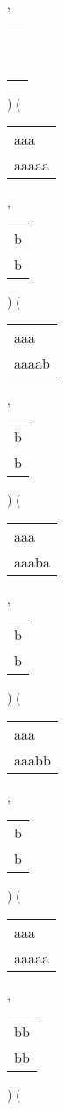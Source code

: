 \begin{description}
 , 
\begin{tabular}{|l|} \hline
\ \\ \ \\ \hline
\end{tabular} 
) 
 ( 
\begin{tabular}{|l|} \hline
aaa\ \  \\
aaaaa \\
\hline
\end{tabular} 
 , 
\begin{tabular}{|l|} \hline
b \\
b \\
\hline
\end{tabular} 
) 
 ( 
\begin{tabular}{|l|} \hline
aaa\ \  \\
aaaab \\
\hline
\end{tabular} 
 , 
\begin{tabular}{|l|} \hline
b \\
b \\
\hline
\end{tabular} 
) 
 ( 
\begin{tabular}{|l|} \hline
aaa\ \  \\
aaaba \\
\hline
\end{tabular} 
 , 
\begin{tabular}{|l|} \hline
b \\
b \\
\hline
\end{tabular} 
) 
 ( 
\begin{tabular}{|l|} \hline
aaa\ \  \\
aaabb \\
\hline
\end{tabular} 
 , 
\begin{tabular}{|l|} \hline
b \\
b \\
\hline
\end{tabular} 
) 
 ( 
\begin{tabular}{|l|} \hline
aaa\ \  \\
aaaaa \\
\hline
\end{tabular} 
 , 
\begin{tabular}{|l|} \hline
bb \\
bb \\
\hline
\end{tabular} 
) 
 ( 
\begin{tabular}{|l|} \hline

\end{tabular}
\end{description}
